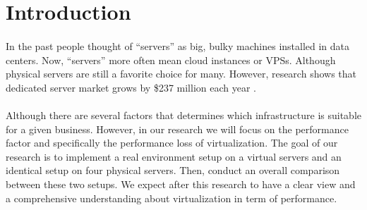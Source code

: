 \section{Introduction}
\paragraph{}
In the past people thought of “servers” as big, bulky machines installed in data centers. Now, “servers” more often mean cloud instances or VPSs. Although physical servers are still a favorite choice for many. However, research shows that dedicated server market grows by \$237 million each year \cite{c1}. 
\paragraph{}
Although there are several factors that determines which infrastructure is suitable for a given business. However, in our research we will focus on the performance factor and specifically the performance loss of virtualization. The goal of our research is to implement a real environment setup on a virtual servers and an identical setup on four physical servers. Then, conduct an overall comparison between these two setups. We expect after this research to have a clear view and a comprehensive understanding about virtualization in term of performance. 
